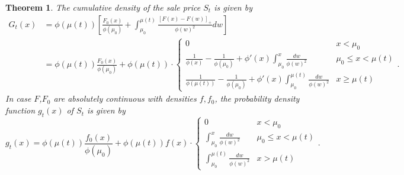 \documentclass{article}
\newtheorem{thm}{Theorem}[section]
\numberwithin{equation}{section}
\begin{document}
\begin{thm}
	The cumulative density of the sale price $S_t$ is given by
	\begin{align}\label{Gdist}G_t(x)&=
		\phi(\mu(t))\left[ \frac{F_0(x)}{\phi(\mu_0)}+\int_{\mu_0}^{\mu(t)} \frac{[F(x)-F(w)]_+}{\phi(w)^2} dw\right]\\
		&=\phi(\mu(t)) \frac{F_0(x)}{\phi(\mu_0)}+\phi(\mu(t))\cdot 
		\begin{cases}
			0 &  x<\mu_0\\
			\frac{1}{\phi(x)}-\frac{1}{\phi(\mu_0)}+\phi'(x)\int_{\mu_0}^{x}\frac{dw}{\phi(w)^2}    & \mu_0\leq x<\mu(t)\\
			\frac{1}{\phi(\mu(t))}-\frac{1}{\phi(\mu_0)}+\phi'(x)\int_{\mu_0}^{\mu(t)}\frac{dw}{\phi(w)^2}	& x\geq \mu(t)
		\end{cases}.\nonumber
	\end{align}
	In case $F$,$F_0$ are absolutely continuous with densities $f,f_0$, the probability density function $g_t(x)$  of $S_t$ is given by
	\begin{equation}\label{density}g_t(x)
		=\phi(\mu(t)) \frac{f_0(x)}{\phi(\mu_0)}+\phi(\mu(t)) f(x)\cdot \begin{cases}
			0 & x<\mu_0\\
			\int_{\mu_0}^{x}\frac{dw}{\phi(w)^2}  & \mu_0\leq x<\mu(t)\\
			\int_{\mu_0}^{\mu(t)}\frac{dw}{\phi(w)^2}	& x>\mu(t)
		\end{cases}
		.\end{equation}
\end{thm}
\end{document}
